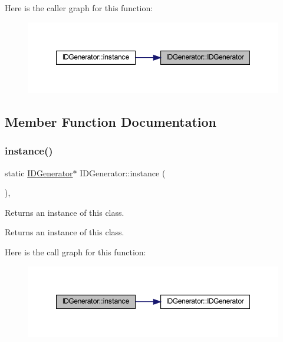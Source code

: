 Here is the caller graph for this function\+:\nopagebreak
\begin{figure}[H]
\begin{center}
\leavevmode
\includegraphics[width=350pt]{class_i_d_generator_a8209b55f50b469c47f977660a769b1da_icgraph}
\end{center}
\end{figure}


\subsection{Member Function Documentation}
\mbox{\label{class_i_d_generator_ad852c6dadc89e1020e4b3932f5a97bb3}} 
\subsubsection{\texorpdfstring{instance()}{instance()}}
{\footnotesize\ttfamily static \hyperlink{class_i_d_generator}{I\+D\+Generator}$\ast$ I\+D\+Generator\+::instance (\begin{DoxyParamCaption}{ }\end{DoxyParamCaption})\hspace{0.3cm}{\ttfamily [inline]}, {\ttfamily [static]}}

Returns an instance of this class. \begin{DoxyReturn}{Returns}
an instance of this class. 
\end{DoxyReturn}
Here is the call graph for this function\+:\nopagebreak
\begin{figure}[H]
\begin{center}
\leavevmode
\includegraphics[width=350pt]{class_i_d_generator_ad852c6dadc89e1020e4b3932f5a97bb3_cgraph}
\end{center}
\end{figure}
\mbox{\label{class_i_d_generator_a99d8cabb2ec6a17888a8ccbe9c85fee0}} 
